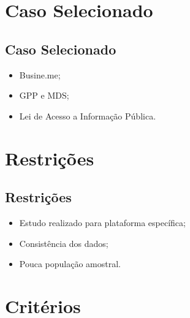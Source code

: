 \documentclass{beamer}
\begin{document}
\section{Caso Selecionado} %
\subsection{Caso Selecionado}
\begin{frame}
  \begin{itemize}
      \item Busine.me;  
      \item GPP e MDS;
      \item Lei de Acesso a Informação Pública.
  \end{itemize}
\end{frame}

\section{Restrições} %
\subsection{Restrições}
\begin{frame}
  \begin{itemize}
      \item Estudo realizado para plataforma específica;  
      \item Consistência dos dados;
      \item Pouca população amostral.
  \end{itemize}
\end{frame}

\section{Critérios} %
\end{document}

